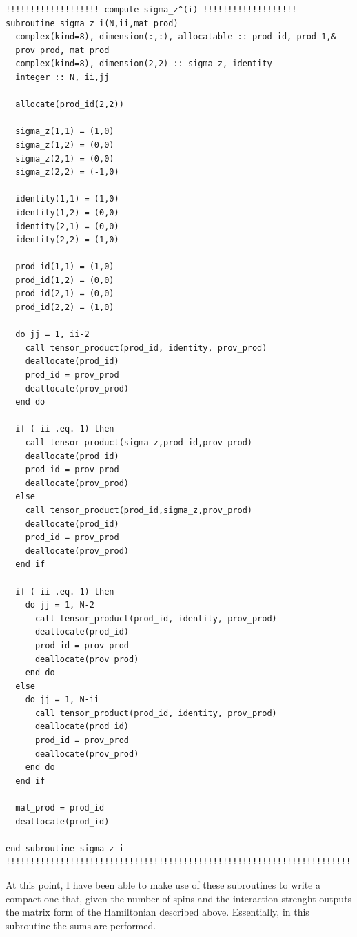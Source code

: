 \documentclass[prb,9pt,notitlepage]{revtex4-1}
\begin{document}
\begin{lstlisting}
!!!!!!!!!!!!!!!!!!! compute sigma_z^(i) !!!!!!!!!!!!!!!!!!!
subroutine sigma_z_i(N,ii,mat_prod)
  complex(kind=8), dimension(:,:), allocatable :: prod_id, prod_1,&
  prov_prod, mat_prod
  complex(kind=8), dimension(2,2) :: sigma_z, identity
  integer :: N, ii,jj

  allocate(prod_id(2,2))

  sigma_z(1,1) = (1,0)
  sigma_z(1,2) = (0,0)
  sigma_z(2,1) = (0,0)
  sigma_z(2,2) = (-1,0)

  identity(1,1) = (1,0)
  identity(1,2) = (0,0)
  identity(2,1) = (0,0)
  identity(2,2) = (1,0)

  prod_id(1,1) = (1,0)
  prod_id(1,2) = (0,0)
  prod_id(2,1) = (0,0)
  prod_id(2,2) = (1,0)

  do jj = 1, ii-2
    call tensor_product(prod_id, identity, prov_prod)
    deallocate(prod_id)
    prod_id = prov_prod
    deallocate(prov_prod)
  end do

  if ( ii .eq. 1) then
    call tensor_product(sigma_z,prod_id,prov_prod)
    deallocate(prod_id)
    prod_id = prov_prod
    deallocate(prov_prod)
  else
    call tensor_product(prod_id,sigma_z,prov_prod)
    deallocate(prod_id)
    prod_id = prov_prod
    deallocate(prov_prod)
  end if

  if ( ii .eq. 1) then
    do jj = 1, N-2
      call tensor_product(prod_id, identity, prov_prod)
      deallocate(prod_id)
      prod_id = prov_prod
      deallocate(prov_prod)
    end do
  else
    do jj = 1, N-ii
      call tensor_product(prod_id, identity, prov_prod)
      deallocate(prod_id)
      prod_id = prov_prod
      deallocate(prov_prod)
    end do
  end if

  mat_prod = prod_id
  deallocate(prod_id)

end subroutine sigma_z_i
!!!!!!!!!!!!!!!!!!!!!!!!!!!!!!!!!!!!!!!!!!!!!!!!!!!!!!!!!!!!!!!!!!!!!!!!
\end{lstlisting}
At this point, I have been able to make use of these subroutines to write a compact one that, given the number of spins and the interaction strenght outputs the matrix form of the Hamiltonian described above. Essentially, in this subroutine the sums are performed.
\end{document}
